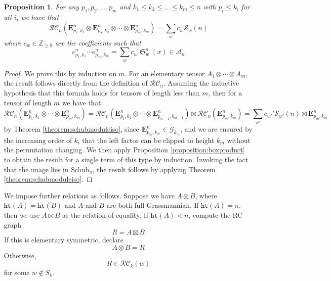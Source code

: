 \documentclass{amsart}
\newtheorem{proposition}[lemma]{Proposition}
\newtheorem{theorem}{Theorem}[section]
\theoremstyle{definition}
\theoremstyle{remark}
\numberwithin{equation}{subsection}
\DeclareMathOperator{\sch}{\mathfrak{S}}
\newcommand{\grass}{\mathcal{G}}
\newcommand{\hr}{\mathtt{ht}}
\newcommand{\RC}{\mathcal{RC}}
\newcommand{\coma}{\mathcal{A}}
\begin{document}
\begin{proposition} \label{proposition:eproductworks}
For any $p_1,p_2,\ldots,p_m$ and $k_1\leq k_2\leq\ldots\leq k_m\leq n$ with $p_i\leq k_i$ for all $i$, we have that
$$\RC_n(\mathbf{E}_{p_1,k_1}^n\otimes \mathbf{E}_{p_2,k_2}^n\otimes \cdots \otimes \mathbf{E}_{p_m,k_m}^n) = \sum_{w} c_w\mathcal{S}_w(n)$$
where $c_w\in \mathbb{Z}_{\geq 0}$ are the coefficients such that
$$e_{p_1,k_1}^n\cdots e_{p_m,k_m}^n = \sum_w c_w \sch_w^n(x)\in \coma_n$$
\end{proposition}
\begin{proof}
We prove this by induction on $m$. For an elementary tensor $A_1\otimes \cdots \otimes A_m$, the result follows directly from the definition of $\RC_n$. Assuming the inductive hypothesis that this formula holds for tensors of length less than $m$, then for a tensor of length $m$ we have that
$$\RC_n(\mathbf{E}_{p_1,k_1}^n\otimes \cdots \otimes \mathbf{E}_{p_m,k_m}^n) = \RC_n(\mathbf{E}_{p_1,k_1}^n\otimes \cdots \otimes \mathbf{E}_{p_{m-1},k_{m-1}}^n)\boxtimes \RC_n(\mathbf{E}_{p_m,k_m}^n)=\sum_{w'} c_{w'}' \mathcal{S}_{w'}(n)\boxtimes \mathbf{E}_{p_m,k_m}^n$$
by Theorem \ref{theorem:schubmoduleiso}, since $\mathbf{E}_{p_m,k_m}^n\in\grass_{k_m}$, and we are ensured by the increasing order of $k_i$ that the left factor can be clipped to height $k_m$ without the permutation changing. We then apply Proposition \ref{proposition:boxproduct} to obtain the result for a single term of this type by induction. Invoking the fact that the image lies in $\mathrm{Schub}_n$, the result follows by applying Theorem \ref{theorem:schubmoduleiso}.
\end{proof}

We impose further relations as follows. Suppose we have $A\otimes B$, where $\hr(A)=\hr(B)$ and $A$ and $B$ are both full Grassmannian. If $\hr(A) = n$, then we use $A\boxtimes B$ as the relation of equality. If $\hr(A)<n$, compute the RC graph
$$R = A\boxtimes B$$
If this is elementary symmetric, declare
$$A\otimes B = R$$
Otherwise,
$$R\in \RC_k(w)$$
for some $w\notin S_k$.
\end{document}
